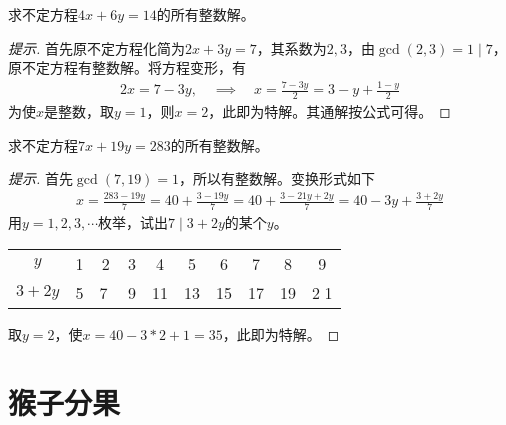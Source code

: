 \begin{example}
  求不定方程$4x+6y=14$的所有整数解。
\end{example}
\begin{proof}[提示]
  首先原不定方程化简为$2x+3y=7$，其系数为$2,3$，由$\gcd(2,3)=1\mid 7$，原不定方程有整数解。将方程变形，有
  \begin{align*}
    2x = 7-3y,\quad\implies\quad x=\frac{7-3y}{2}=3-y+\frac{1-y}{2}
  \end{align*}
  为使$x$是整数，取$y=1$，则$x=2$，此即为特解。其通解按公式可得。
\end{proof}

\begin{example}
  求不定方程$7x+19y=283$的所有整数解。
\end{example}
\begin{proof}[提示]
  首先$\gcd(7,19)=1$，所以有整数解。变换形式如下
  \begin{align*}
    x=\frac{283-19y}{7}=40+\frac{3-19y}{7}=40+\frac{3-21y+2y}{7}=40-3y+\frac{3+2y}{7}
  \end{align*}
  用$y=1,2,3,\cdots$枚举，试出$7\mid 3+2y$的某个$y$。
  \begin{center}
    \begin{tabular}{cccccccccc}
      \toprule
      $y$    & 1 & 2 & 3 & 4  & 5  & 6  & 7  & 8  & 9 \\
      $3+2y$ & 5 & \textcircled{7} & 9 & 11 & 13 & 15 & 17 & 19 & \textcircled{21}\\
      \bottomrule
    \end{tabular}
  \end{center}
  取$y=2$，使$x=40-3*2+1=35$，此即为特解。  
\end{proof}

\section{猴子分果}
\label{sec:monkeys-dividing-fruits}

